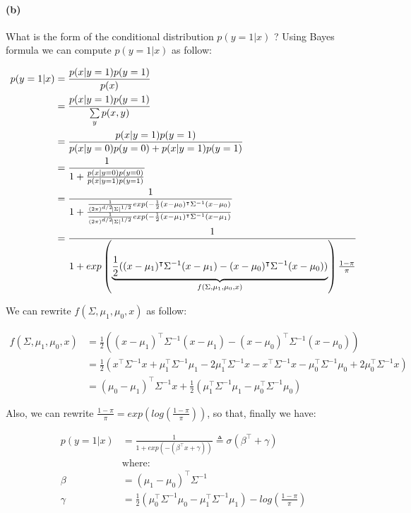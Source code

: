 \documentclass[11pt]{article}
\numberwithin{figure}{section} %
\begin{document}
\paragraph{(b)} What is the form of the conditional distribution $p(y = 1|x)$ ?
\newline
Using Bayes formula we can compute $p(y=1|x)$ as follow:

\begin{equation}
\begin{split}
p(y=1|x) & = \frac{p(x| y= 1)p(y=1)}{p(x)} \\
& = \frac{p(x| y= 1)p(y=1)}{\sum\limits_{y} p(x,y)} \\
& = \frac{p(x| y= 1)p(y=1)}{p(x|y=0)p(y=0) + p(x|y=1)p(y=1)} \\
& = \frac{1}{1 + \frac{p(x|y=0)p(y=0)}{p(x|y=1)p(y=1)}} \\
& = \frac{1}{1+\frac{\frac{1}{(2\pi)^{d/2}\abs{\Sigma}^{1/2}}exp(-\frac{1}{2}(x-\mu_0)^{\intercal}\Sigma^{-1}(x-\mu_0)}{\frac{1}{(2\pi)^{d/2}\abs{\Sigma}^{1/2}}exp(-\frac{1}{2}(x-\mu_1)^{\intercal}\Sigma^{-1}(x-\mu_1)}} \\
& = \frac{1}{1 + exp \left( \underbrace{\frac{1}{2}((x-\mu_1)^{\intercal}\Sigma^{-1}(x-\mu_1) - (x-\mu_0)^{\intercal}\Sigma^{-1}(x-\mu_0))}_{f(\Sigma, \mu_1, \mu_0, x)} \right)\frac{1-\pi}{\pi}}
\end{split}
\end{equation}

We can rewrite $f(\Sigma, \mu_1, \mu_0, x)$ as follow:

\begin{align*}
f(\Sigma, \mu_1, \mu_0, x) & = \frac{1}{2}((x-\mu_1)^{\intercal}\Sigma^{-1}(x-\mu_1) - (x-\mu_0)^{\intercal}\Sigma^{-1}(x-\mu_0)) \\
 & = \frac{1}{2} \left( x^{\intercal}\Sigma^{-1}x + \mu_1^{\intercal}\Sigma^{-1}\mu_1 - 2\mu_1^{\intercal}\Sigma^{-1}x - x^{\intercal}\Sigma^{-1}x - \mu_0^{\intercal}\Sigma^{-1}\mu_0 + 2\mu_0^{\intercal}\Sigma^{-1}x \right) \\
& = (\mu_0 - \mu_1)^{\intercal}\Sigma^{-1}x + \frac{1}{2}\left( \mu_1^{\intercal}\Sigma^{-1}\mu_1 - \mu_0^{\intercal}\Sigma^{-1}\mu_0 \right)
\end{align*}

Also, we can rewrite $\frac{1-\pi}{\pi} = exp(log(\frac{1-\pi}{\pi}))$, so that, finally we have:

\begin{tcolorbox}
\begin{align*}
p(y=1|x) & = \frac{1}{1 + exp(-( \beta^{\intercal}x + \gamma))} \triangleq \sigma(\beta^{\intercal} + \gamma) \\
& \text{where: } \\ 
\beta & = (\mu_1 - \mu_0)^{\intercal} \Sigma^{-1} \\
\gamma & = \frac{1}{2}\left( \mu_0^{\intercal}\Sigma^{-1}\mu_0 - \mu_1^{\intercal}\Sigma^{-1}\mu_1 \right) - log\left(\frac{1-\pi}{\pi}\right)
\end{align*}
\end{tcolorbox}
\end{document}
